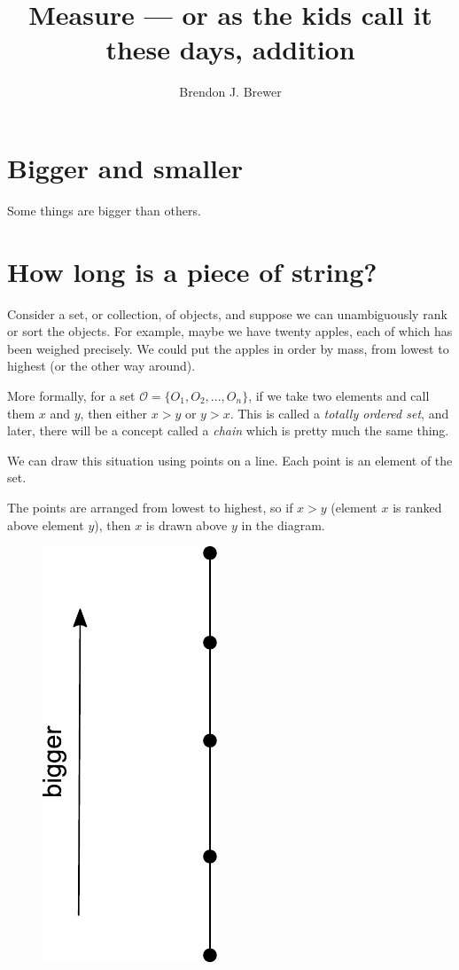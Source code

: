 \documentclass[a4paper, 12pt]{article}
\title{Measure --- or as the kids call it these days, addition}
\author{Brendon J. Brewer}
\date{}
\begin{document}
\maketitle

\setlength{\parindent}{0pt}
\setlength{\parskip}{8pt}

\section{Bigger and smaller}
Some things are bigger than others.

\section{How long is a piece of string?}

Consider a set, or collection, of objects, and suppose we can
unambiguously rank or sort the objects. For example, maybe we
have twenty apples, each of which has been weighed precisely.
We could put the apples in order by mass, from lowest to highest (or
the other way around).

More formally, for a set $\mathcal{O} = \{O_1, O_2, ..., O_n\}$,
if we take two elements
and call them $x$ and $y$, then either $x > y$ or $y > x$.
This is called a {\em totally ordered set}, and later, there
will be a concept called a {\em chain} which is pretty much
the same thing.

We can draw this situation using points on a line. Each point
is an element of the set.

The points are arranged from lowest to highest, so if $x > y$ (element
$x$ is ranked above element $y$), then $x$ is drawn above $y$ in the
diagram.


\begin{figure}[!ht]
\centering
\includegraphics[scale=0.6]{figures/totally_ordered_set.pdf}
\caption{\label{fig:totally_ordered_set}}
\end{figure}
\end{document}
